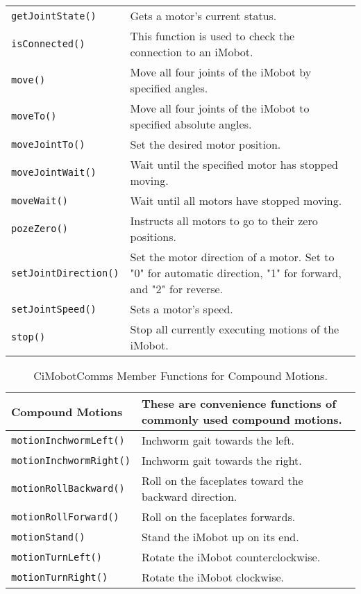 \begin{table}[!hp]
\begin{center}
\begin{tabular}{p{38 mm}p{77 mm}}
\texttt{getJointState()} & Gets a motor's current status. \\
\texttt{isConnected()} & This function is used to check the connection to an iMobot. \\
\texttt{move()} & Move all four joints of the iMobot by specified angles. \\
\texttt{moveTo()} & Move all four joints of the iMobot to specified absolute angles. \\
\texttt{moveJointTo()} & Set the desired motor position. \\
\texttt{moveJointWait()} & Wait until the specified motor has stopped moving. \\
\texttt{moveWait()} & Wait until all motors have stopped moving. \\
\texttt{pozeZero()} & Instructs all motors to go to their zero positions. \\
\texttt{setJointDirection()} & Set the motor direction of a motor. Set
to "0" for automatic direction, "1" for forward, and "2" for reverse. \\
\texttt{setJointSpeed()} & Sets a motor's speed. \\
\texttt{stop()} & Stop all currently executing motions of the iMobot. \\
\hline
\end{tabular}
\end{center}
\label{mobilec_api_cbinary}
\end{table}

\begin{table}[!h]
\begin{center}
\caption{CiMobotComms Member Functions for Compound Motions.}
\begin{tabular}{p{38 mm}p{77 mm}}
Compound Motions & These are convenience functions of commonly used compound motions. \\
\hline
\texttt{motionInchwormLeft()} \dotfill & Inchworm gait towards the left. \\
\texttt{motionInchwormRight()} \dotfill & Inchworm gait towards the right. \\
\texttt{motionRollBackward()} \dotfill & Roll on the faceplates toward the backward direction. \\
\texttt{motionRollForward()} \dotfill & Roll on the faceplates forwards. \\
\texttt{motionStand()} \dotfill & Stand the iMobot up on its end. \\
\texttt{motionTurnLeft()} \dotfill & Rotate the iMobot counterclockwise. \\
\texttt{motionTurnRight()} \dotfill & Rotate the iMobot clockwise. \\
\hline
\end{tabular}
\end{center}
\label{mobilec_api_compound}
\end{table}

